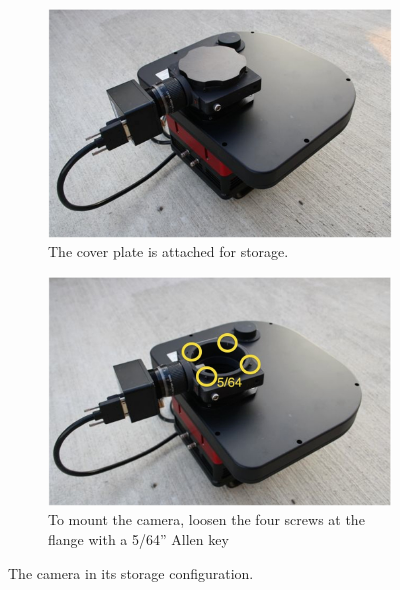 \documentclass[a4paper, 11pt, fleqn]{memoir}
\begin{document}
\begin{figure}
    \centering
    \begin{subfigure}[t]{0.47\textwidth}
        \centering
        \includegraphics[width=\textwidth]{ccd-closed}
        \caption{The cover plate is attached for storage.}
        \label{fig:camera-cover-plate}
    \end{subfigure}
    \begin{subfigure}[t]{0.47\textwidth}
        \centering
        \includegraphics[width=\textwidth]{ccd-open}
        \caption{To mount the camera, loosen the four screws at the flange with a 5/64'' Allen key}
        \label{fig:camera-mount-screws}
    \end{subfigure}
    \caption{The camera in its storage configuration.}
\end{figure}
\end{document}
